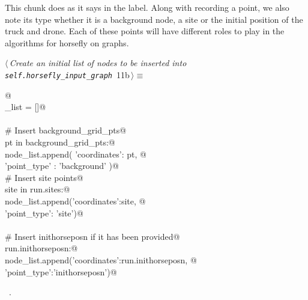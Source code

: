 \documentclass[11.5pt]{report}
\begin{document}
This chunk does as it says in the label. Along with recording a point, we also note its 
type whether it is a background node, a site or the initial position of the truck and drone. 
Each of these points will have different roles to play in the algorithms for horsefly on graphs. 

\begin{flushleft} \small
\begin{minipage}{\linewidth}\label{scrap12}\raggedright\small
{} $\langle\,${\itshape Create an initial list of nodes to be inserted into \verb|self.horsefly_input_graph|}\nobreak\ {\footnotesize {11b}}$\,\rangle\equiv$
\vspace{-1ex}
\begin{list}{}{} \item
\mbox{}\verb@   @\\
\mbox{}\verb@node_list = []@\\
\mbox{}\verb@@\\
\mbox{}\verb@# Insert background_grid_pts@\\
\mbox{}\verb@for pt in background_grid_pts:@\\
\mbox{}\verb@        node_list.append( {'coordinates': pt, @\\
\mbox{}\verb@                           'point_type' : 'background'} )@\\
\mbox{}\verb@# Insert site points@\\
\mbox{}\verb@for site in run.sites:@\\
\mbox{}\verb@        node_list.append({'coordinates':site, @\\
\mbox{}\verb@                          'point_type': 'site'})@\\
\mbox{}\verb@@\\
\mbox{}\verb@# Insert inithorseposn if it has been provided@\\
\mbox{}\verb@if run.inithorseposn:@\\
\mbox{}\verb@         node_list.append({'coordinates':run.inithorseposn, @\\
\mbox{}\verb@                           'point_type':'inithorseposn'})@\\
\mbox{}\verb@@{\NWsep}
\end{list}
\vspace{-1.5ex}
\footnotesize
\begin{list}{}{\setlength{\itemsep}{-\parsep}\setlength{\itemindent}{-\leftmargin}}
\item \NWtxtMacroRefIn\ .

\item{}
\end{list}
\end{minipage}\vspace{4ex}
\end{flushleft}
\end{document}
